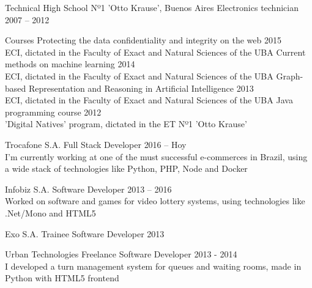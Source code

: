 \documentclass[10pt,a4paper]{article}
\begin{document}
\vspace{0.2em}
\headedsection
  {Technical High School Nº1 'Otto Krause', Buenos Aires}
  {\textsc{}} {%
  \headedsubsection
    {Electronics technician}
    {2007 -- 2012} {}
}

\vspace{0.2em}
\headedsection
  {Courses}
  {\textsc{}} {%
  \headedsubsection
    {Protecting the data confidentiality and integrity on the web}
    {2015}{\\
    ECI, dictated in the Faculty of Exact and Natural Sciences of the UBA}
  \headedsubsection
    {Current methods on machine learning}
    {2014}{\\
    ECI, dictated in the Faculty of Exact and Natural Sciences of the UBA}
  \headedsubsection
    {Graph-based Representation and Reasoning in Artificial Intelligence}
    {2013}{\\
    ECI, dictated in the Faculty of Exact and Natural Sciences of the UBA}
  \headedsubsection
    {Java programming course}
    {2012}{\\
    'Digital Natives' program, dictated in the ET Nº1 'Otto Krause'}
}


\spacedhrule{0.8em}{-0.4em}


\vspace{0.2em}
\headedsection
    {Trocafone S.A.}
    {\textsc{}}{
    \headedsubsection
        {Full Stack Developer}
        {2016 -- Hoy}
        {\\I'm currently working at one of the must successful e-commerces in Brazil, using a wide stack of technologies like Python, PHP, Node and Docker}
}

\vspace{0.2em}
\headedsection
    {Infobiz S.A.}
    {\textsc{}}{
    \headedsubsection
        {Software Developer}
        {2013 -- 2016}
        {\\Worked on software and games for video lottery systems, using technologies like .Net/Mono and HTML5}
}

\vspace{0.2em}
\headedsection
    {Exo S.A.}
    {\textsc{}}{
    \headedsubsection
        {Trainee Software Developer}
        {2013}
        {}
}

\vspace{0.2em}
\headedsection
    {Urban Technologies}
    {\textsc{}}{
    \headedsubsection
        {Freelance Software Developer}
        {2013 - 2014}
        {\\I developed a turn management system for queues and waiting rooms, made in Python with HTML5 frontend}
}
\end{document}
